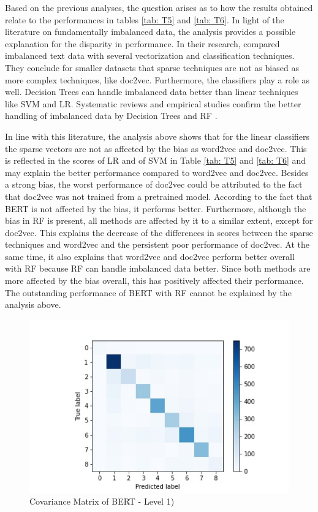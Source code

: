 \documentclass[12pt, a4paper, titlepage]{article}
\begin{document}
Based on the previous analyses, the question arises as to how the results obtained relate to the performances in tables \ref{tab: T5} and \ref{tab: T6}. In light of the literature on fundamentally imbalanced data, the analysis provides a possible explanation for the disparity in performance. In their research, \citet{padurariu2019} compared imbalanced text data with several vectorization and classification techniques. They conclude for smaller datasets that sparse techniques are not as biased as more complex techniques, like doc2vec. Furthermore, the classifiers play a role as well. Decision Trees can handle imbalanced data better than linear techniques like \ac{SVM} and \ac{LR}. Systematic reviews and empirical studies confirm the better handling of imbalanced data by Decision Trees and \ac{RF} \citep{kaur2019, muchlinski2016, krawczyk2016}. 

In line with this literature, the analysis above shows that for the linear classifiers the sparse vectors are not as affected by the bias as word2vec and doc2vec. This is reflected in the scores of LR and of SVM in Table \ref{tab: T5} and \ref{tab: T6} and may explain the better performance compared to word2vec and doc2vec. Besides a strong bias, the worst performance of doc2vec could be attributed to the fact that doc2vec was not trained from a pretrained model. According to the fact that \ac{BERT} is not affected by the bias, it performs better. Furthermore, although the bias in RF is present, all methods are affected by it to a similar extent, except for doc2vec. This explains the decrease of the differences in scores between the sparse techniques and word2vec and the persistent poor performance of doc2vec. At the same time, it also explains that word2vec and doc2vec perform better overall with RF because RF can handle imbalanced data better. Since both methods are more affected by the bias overall, this has positively affected their performance. The outstanding performance of \ac{BERT} with \ac{RF} cannot be explained by the analysis above.

\begin{figure}[]
  \center
  \includegraphics[scale=0.5]{cm_bert_clf_l1.jpg}
  \caption{\label{fig: F25} Covariance Matrix of BERT - Level 1)}
\end{figure}
\end{document}
